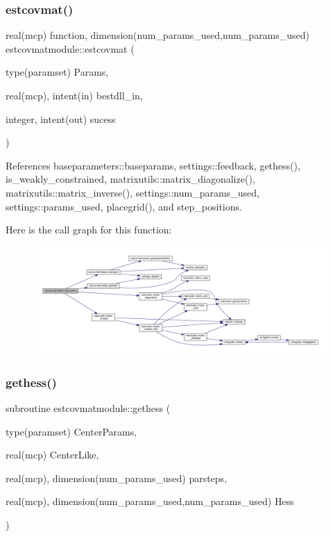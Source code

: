 \subsubsection{\texorpdfstring{estcovmat()}{estcovmat()}}
{\footnotesize\ttfamily real(mcp) function, dimension(num\+\_\+params\+\_\+used,num\+\_\+params\+\_\+used) estcovmatmodule\+::estcovmat (\begin{DoxyParamCaption}\item[{type(paramset)}]{Params,  }\item[{real(mcp), intent(in)}]{bestdll\+\_\+in,  }\item[{integer, intent(out)}]{sucess }\end{DoxyParamCaption})}



References baseparameters\+::baseparams, settings\+::feedback, gethess(), is\+\_\+weakly\+\_\+constrained, matrixutils\+::matrix\+\_\+diagonalize(), matrixutils\+::matrix\+\_\+inverse(), settings\+::num\+\_\+params\+\_\+used, settings\+::params\+\_\+used, placegrid(), and step\+\_\+positions.

Here is the call graph for this function\+:
\nopagebreak
\begin{figure}[H]
\begin{center}
\leavevmode
\includegraphics[width=350pt]{namespaceestcovmatmodule_afcc46985583aeb4fed0524e52dde8c8a_cgraph}
\end{center}
\end{figure}
\mbox{\label{namespaceestcovmatmodule_a24745156f0a9a14a853ca7db8796afdc}} 
\subsubsection{\texorpdfstring{gethess()}{gethess()}}
{\footnotesize\ttfamily subroutine estcovmatmodule\+::gethess (\begin{DoxyParamCaption}\item[{type(paramset)}]{Center\+Params,  }\item[{real(mcp)}]{Center\+Like,  }\item[{real(mcp), dimension(num\+\_\+params\+\_\+used)}]{parsteps,  }\item[{real(mcp), dimension(num\+\_\+params\+\_\+used,num\+\_\+params\+\_\+used)}]{Hess }\end{DoxyParamCaption})}



